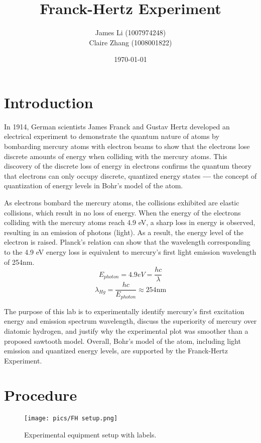 \documentclass[12pt, letterpaper, twoside]{article}
\title{\textbf{Franck-Hertz Experiment}}
\author{James Li (1007974248) \\
Claire Zhang (1008001822)}\vspace{-2em}
\date{\today}
\begin{document}
\maketitle

\section{Introduction}

In 1914, German scientists James Franck and Gustav Hertz developed an electrical experiment to demonstrate the quantum nature of atoms by bombarding mercury atoms with electron beams to show that the electrons lose discrete amounts of energy when colliding with the mercury atoms. This discovery of the discrete loss of energy in electrons confirms the quantum theory that electrons can only occupy discrete, quantized energy states \textbf{---} the concept of quantization of energy levels in Bohr's model of the atom.

As electrons bombard the mercury atoms, the collisions exhibited are elastic collisions, which result in no loss of energy. When the energy of the electrons colliding with the mercury atoms reach 4.9 eV, a sharp loss in energy is observed, resulting in an emission of photons (light). As a result, the energy level of the electron is raised. Planck's relation can show that the wavelength corresponding to the 4.9 eV energy loss is equivalent to mercury's first light emission wavelength of 254nm.
\begin{equation}
    E_{photon} = 4.9 eV = \frac{hc}{\lambda}\label{eqn:planck}
\end{equation}
\begin{equation*}
    \lambda_{Hg} = \frac{hc}{E_{photon}} \approx 254\text{nm}
\end{equation*}

The purpose of this lab is to experimentally identify mercury's first excitation energy and emission spectrum wavelength, discuss the superiority of mercury over diatomic hydrogen, and justify why the experimental plot was smoother than a proposed sawtooth model. Overall, Bohr's model of the atom, including light emission and quantized energy levels, are supported by the Franck-Hertz Experiment.


\section{Procedure}

\begin{figure}[!ht]
    \centering
    \texttt{[image: pics/FH setup.png]}
    \caption{Experimental equipment setup with labels.}
    \label{fig:setup}
\end{figure}
\end{document}
